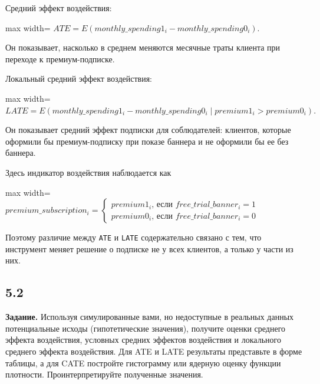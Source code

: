 \documentclass[11pt]{article}
\begin{document}
Средний эффект воздействия:

\begin{center}
\begin{adjustbox}{max width=\linewidth}
\(\displaystyle ATE = E(monthly\_spending1_i - monthly\_spending0_i).\)
\end{adjustbox}
\end{center}

Он показывает, насколько в среднем меняются месячные траты клиента при
переходе к премиум-подписке.

Локальный средний эффект воздействия:

\begin{center}
\begin{adjustbox}{max width=\linewidth}
\(\displaystyle LATE = E(monthly\_spending1_i - monthly\_spending0_i \mid premium1_i > premium0_i).\)
\end{adjustbox}
\end{center}

Он показывает средний эффект подписки для соблюдателей: клиентов,
которые оформили бы премиум-подписку при показе баннера и не оформили бы
ее без баннера.

Здесь индикатор воздействия наблюдается как

\begin{center}
\begin{adjustbox}{max width=\linewidth}
\(\displaystyle premium\_subscription_i = \begin{cases}premium1_i\text{, если }free\_trial\_banner_i = 1\\ premium0_i\text{, если }free\_trial\_banner_i = 0\end{cases}\)
\end{adjustbox}
\end{center}

Поэтому различие между \texttt{ATE} и \texttt{LATE} содержательно
связано с тем, что инструмент меняет решение о подписке не у всех
клиентов, а только у части из них.

    \subsection{5.2}\label{section}

\textbf{Задание.} Используя симулированные вами, но недоступные в
реальных данных потенциальные исходы (гипотетические значения), получите
оценки среднего эффекта воздействия, условных средних эффектов
воздействия и локального среднего эффекта воздействия. Для ATE и LATE
результаты представьте в форме таблицы, а для CATE постройте гистограмму
или ядерную оценку функции плотности. Проинтерпретируйте полученные
значения.
\end{document}
